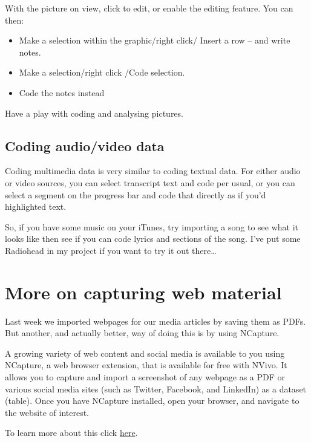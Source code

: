 \documentclass[
]{book}
\providecommand{\tightlist}{%
  \setlength{\itemsep}{0pt}\setlength{\parskip}{0pt}}
\begin{document}
With the picture on view, click to edit, or enable the editing feature. You can then:

\begin{itemize}
\tightlist
\item
  Make a selection within the graphic/right click/ Insert a row -- and write notes.
\item
  Make a selection/right click /Code selection.
\item
  Code the notes instead
\end{itemize}

Have a play with coding and analysing pictures.

\hypertarget{coding-audiovideo-data}{%
\subsection{Coding audio/video data}\label{coding-audiovideo-data}}

Coding multimedia data is very similar to coding textual data. For either audio or video sources, you can select transcript text and code per usual, or you can select a segment on the progress bar and code that directly as if you'd highlighted text.

So, if you have some music on your iTunes, try importing a song to see what it looks like then see if you can code lyrics and sections of the song. I've put some Radiohead in my project if you want to try it out there\ldots{}

\hypertarget{more-on-capturing-web-material}{%
\section{More on capturing web material}\label{more-on-capturing-web-material}}

Last week we imported webpages for our media articles by saving them as PDFs. But another, and actually better, way of doing this is by using NCapture.

A growing variety of web content and social media is available to you using NCapture, a web browser extension, that is available for free with NVivo. It allows you to capture and import a screenshot of any webpage as a PDF or various social media sites (such as Twitter, Facebook, and LinkedIn) as a dataset (table). Once you have NCapture installed, open your browser, and navigate to the website of interest.

To learn more about this click \href{https://www.youtube.com/watch?v=-rex1HaRg3k\&t=3s}{here}.
\end{document}
